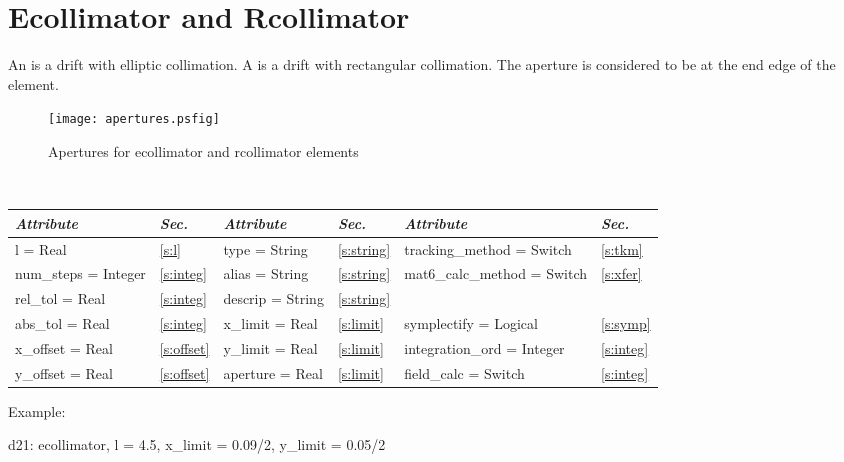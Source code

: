 \section{Ecollimator and Rcollimator}
\label{s:col}

An  is a drift with elliptic collimation.
A  is a drift with rectangular collimation.
The aperture is considered to be at the end edge of the element.
\begin{figure}
  \centering
  \texttt{[image: apertures.psfig]}
  \caption{Apertures for ecollimator and rcollimator elements}
\end{figure}

\toffset
\begin{center}
\tt
\begin{tabular}{|l|l||l|l||l|l|} \hline
  {\sl Attribute} & {\sl Sec.}  & {\sl Attribute} & {\sl Sec.} & {\sl Attribute} & {\sl Sec.} \\ \hline
  l        = Real       & \ref{s:l}      & type = String                & \ref{s:string} & tracking\_method = Switch    & \ref{s:tkm}   \\ \hline
  num\_steps = Integer  & \ref{s:integ}  & alias = String               & \ref{s:string} & mat6\_calc\_method = Switch  & \ref{s:xfer}  \\ \hline
  rel\_tol = Real       & \ref{s:integ}  & descrip = String             & \ref{s:string} &                              &               \\ \hline
  abs\_tol = Real       & \ref{s:integ}  & x\_limit = Real              & \ref{s:limit}  & symplectify = Logical        & \ref{s:symp}  \\ \hline
  x\_offset  = Real     & \ref{s:offset} & y\_limit = Real              & \ref{s:limit}  & integration\_ord = Integer   & \ref{s:integ} \\ \hline
  y\_offset  = Real     & \ref{s:offset} & aperture = Real              & \ref{s:limit}  & field\_calc = Switch         & \ref{s:integ} \\ \hline                                
\end{tabular}
\end{center}
\toffset

\vskip0.05in \noindent
Example:
\begin{example}
  d21: ecollimator, l = 4.5, x_limit = 0.09/2, y_limit = 0.05/2
\end{example}

